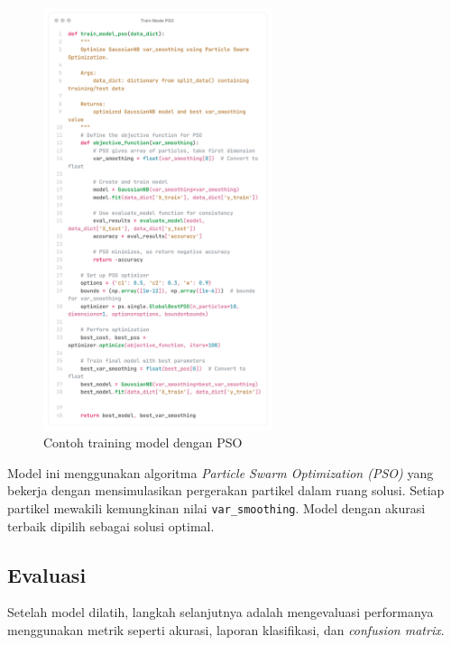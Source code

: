 \begin{figure}[H]
  \centering
  \includegraphics[width=0.6\textwidth]{figure/chapter-4-train_model_pso.png}
  \caption{Contoh training model dengan PSO}
  \label{fig:extract_rgb}
\end{figure}

Model ini menggunakan algoritma \textit{Particle Swarm Optimization (PSO)} yang bekerja dengan mensimulasikan pergerakan partikel dalam ruang solusi. Setiap partikel mewakili kemungkinan nilai \texttt{var\_smoothing}. Model dengan akurasi terbaik dipilih sebagai solusi optimal.

\subsection{Evaluasi} \label{IV.Evaluasi}
Setelah model dilatih, langkah selanjutnya adalah mengevaluasi performanya menggunakan metrik seperti akurasi, laporan klasifikasi, dan \textit{confusion matrix}.

